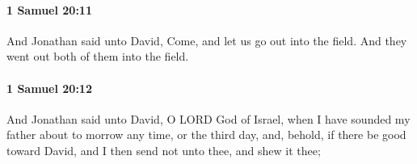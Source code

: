 		\paragraph{1 Samuel 20:11} %
			\label{1SAMUEL-20-11}

			And Jonathan said unto David, Come, and let us go out into the field. And they went out both of them into the field.


		\paragraph{1 Samuel 20:12} %
			\label{1SAMUEL-20-12}

			And Jonathan said unto David, O LORD God of Israel, when I have sounded my father about to morrow any time, or the third day, and, behold, if there be good toward David, and I then send not unto thee, and shew it thee;


